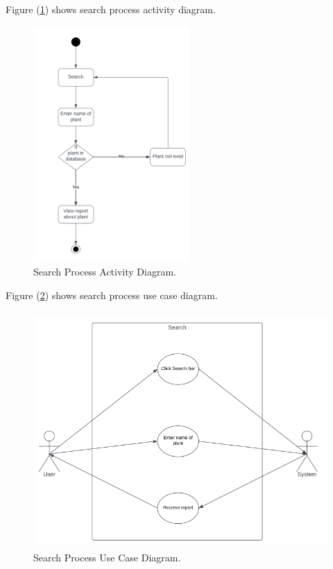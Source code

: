 \noindent Figure (\ref{fig:searchProcAtc}) shows search process activity diagram.
\begin{figure}[H]
    \centering
    \includegraphics[height=9cm]{photos/chapter04/10.png}
    \caption{Search Process Activity Diagram.}
    \label{fig:searchProcAtc}
\end{figure}

\noindent Figure (\ref{fig:searchProcUse}) shows search process use case diagram.
\begin{figure}[H]
    \centering
    \includegraphics[height=9cm]{photos/chapter04/11.png}
    \caption{Search Process Use Case Diagram.}
    \label{fig:searchProcUse}
\end{figure}

